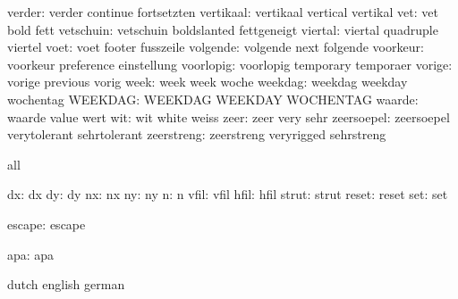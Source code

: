              verder:  verder               continue            fortsetzten
          vertikaal:  vertikaal            vertical            vertikal
                vet:  vet                  bold                fett
          vetschuin:  vetschuin            boldslanted         fettgeneigt
            viertal:  viertal              quadruple           viertel
               voet:  voet                 footer              fusszeile
           volgende:  volgende             next                folgende
           voorkeur:  voorkeur             preference          einstellung
          voorlopig:  voorlopig            temporary           temporaer
             vorige:  vorige               previous            vorig
               week:  week                 week                woche
            weekdag:  weekdag              weekday             wochentag
            WEEKDAG:  WEEKDAG              WEEKDAY             WOCHENTAG
             waarde:  waarde               value               wert
                wit:  wit                  white               weiss
               zeer:  zeer                 very                sehr
         zeersoepel:  zeersoepel           verytolerant        sehrtolerant
         zeerstreng:  zeerstreng           veryrigged          sehrstreng

\stopvariables




\startconstants       all

                 dx:  dx
                 dy:  dy
                 nx:  nx
                 ny:  ny
                  n:  n
               vfil:  vfil
               hfil:  hfil
              strut:  strut
              reset:  reset
                set:  set
                
             escape:  escape
                
                apa:  apa 

\stopconstants




\startconstants       dutch                english             german

